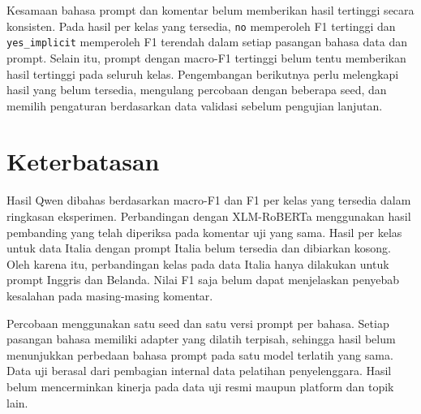 \documentclass[11pt]{article}
\begin{document}
Kesamaan bahasa prompt dan komentar belum memberikan hasil tertinggi secara konsisten. Pada hasil per kelas yang tersedia, \texttt{no} memperoleh F1 tertinggi dan \texttt{yes\_implicit} memperoleh F1 terendah dalam setiap pasangan bahasa data dan prompt. Selain itu, prompt dengan macro-F1 tertinggi belum tentu memberikan hasil tertinggi pada seluruh kelas. Pengembangan berikutnya perlu melengkapi hasil yang belum tersedia, mengulang percobaan dengan beberapa seed, dan memilih pengaturan berdasarkan data validasi sebelum pengujian lanjutan.

\section*{Keterbatasan}
Hasil Qwen dibahas berdasarkan macro-F1 dan F1 per kelas yang tersedia dalam ringkasan eksperimen. Perbandingan dengan XLM-RoBERTa menggunakan hasil pembanding yang telah diperiksa pada komentar uji yang sama. Hasil per kelas untuk data Italia dengan prompt Italia belum tersedia dan dibiarkan kosong. Oleh karena itu, perbandingan kelas pada data Italia hanya dilakukan untuk prompt Inggris dan Belanda. Nilai F1 saja belum dapat menjelaskan penyebab kesalahan pada masing-masing komentar.

Percobaan menggunakan satu seed dan satu versi prompt per bahasa. Setiap pasangan bahasa memiliki adapter yang dilatih terpisah, sehingga hasil belum menunjukkan perbedaan bahasa prompt pada satu model terlatih yang sama. Data uji berasal dari pembagian internal data pelatihan penyelenggara. Hasil belum mencerminkan kinerja pada data uji resmi maupun platform dan topik lain.


\end{document}
